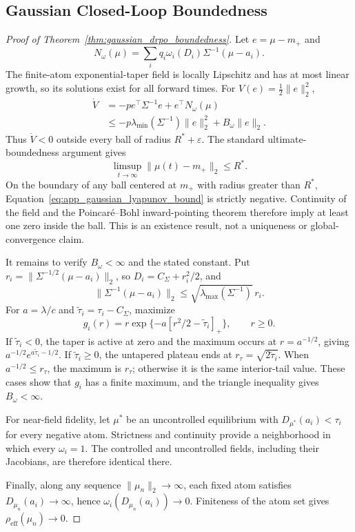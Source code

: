 \documentclass{article}
\theoremstyle{plain}
\theoremstyle{definition}
\theoremstyle{remark}
\begin{document}
\subsection{Gaussian Closed-Loop Boundedness}
\label{app:gaussian_drpo_boundedness}

\begin{proof}[Proof of Theorem~\ref{thm:gaussian_drpo_boundedness}]
Let \(e=\mu-m_+\) and
\[
N_\omega(\mu)=\sum_iq_i\omega_i(D_i)
\Sigma^{-1}(\mu-a_i).
\]
The finite-atom exponential-taper field is locally Lipschitz and has at
most linear growth, so its solutions exist for all forward times.
For \(V(e)=\frac12\|e\|_2^2\),
\begin{align}
\dot V
&=-p e^\top\Sigma^{-1}e+e^\top N_\omega(\mu) \\
&\le-p\lambda_{\min}(\Sigma^{-1})\|e\|_2^2
+B_\omega\|e\|_2.
\label{eq:app_gaussian_lyapunov_bound}
\end{align}
Thus \(\dot V<0\) outside every ball of radius
\(R^*+\varepsilon\). The standard ultimate-boundedness argument gives
\[
\limsup_{t\to\infty}\|\mu(t)-m_+\|_2\le R^*.
\]
On the boundary of any ball centered at \(m_+\) with radius greater
than \(R^*\), Equation~\eqref{eq:app_gaussian_lyapunov_bound} is
strictly negative. Continuity of the field and the Poincar\'e--Bohl
inward-pointing theorem therefore imply at least one zero inside the
ball. This is an existence result, not a uniqueness or global-convergence
claim.

It remains to verify \(B_\omega<\infty\) and the stated constant. Put
\(r_i=\|\Sigma^{-1/2}(\mu-a_i)\|_2\), so
\(D_i=C_\Sigma+r_i^2/2\), and
\[
\|\Sigma^{-1}(\mu-a_i)\|_2
\le\sqrt{\lambda_{\max}(\Sigma^{-1})}\,r_i.
\]
For \(a=\lambda/c\) and
\(\widetilde\tau_i=\tau_i-C_\Sigma\), maximize
\[
g_i(r)=r\exp\{-a[r^2/2-\widetilde\tau_i]_+\},\qquad r\ge0.
\]
If \(\widetilde\tau_i<0\), the taper is active at zero and the maximum
occurs at \(r=a^{-1/2}\), giving
\(a^{-1/2}e^{a\widetilde\tau_i-1/2}\). If
\(\widetilde\tau_i\ge0\), the untapered plateau ends at
\(r_\tau=\sqrt{2\widetilde\tau_i}\). When
\(a^{-1/2}\le r_\tau\), the maximum is \(r_\tau\); otherwise it is the
same interior-tail value. These cases show that \(g_i\) has a finite
maximum, and the triangle inequality gives \(B_\omega<\infty\).

For near-field fidelity, let \(\mu^*\) be an uncontrolled equilibrium
with \(D_{\mu^*}(a_i)<\tau_i\) for every negative atom. Strictness and
continuity provide a neighborhood in which every \(\omega_i=1\).
The controlled and uncontrolled fields, including their Jacobians, are
therefore identical there.

Finally, along any sequence \(\|\mu_n\|_2\to\infty\), each fixed atom
satisfies \(D_{\mu_n}(a_i)\to\infty\), hence
\(\omega_i(D_{\mu_n}(a_i))\to0\). Finiteness of the atom set gives
\(\rho_{\mathrm{eff}}(\mu_n)\to0\).
\end{proof}
\end{document}
